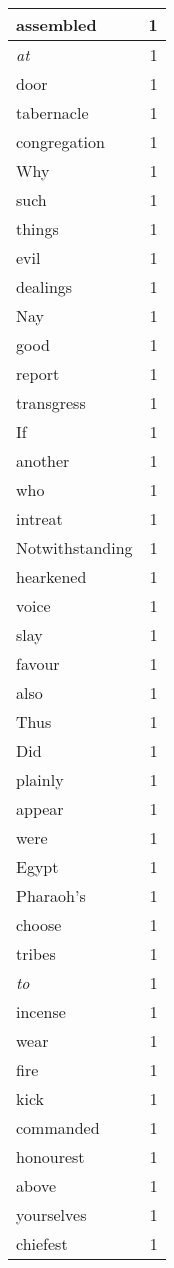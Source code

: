 \begin{center}
\begin{longtable}{l|r}
assembled & 1 \\ \hline
\emph{at} & 1 \\ \hline
door & 1 \\ \hline
tabernacle & 1 \\ \hline
congregation & 1 \\ \hline
Why & 1 \\ \hline
such & 1 \\ \hline
things & 1 \\ \hline
evil & 1 \\ \hline
dealings & 1 \\ \hline
Nay & 1 \\ \hline
good & 1 \\ \hline
report & 1 \\ \hline
transgress & 1 \\ \hline
If & 1 \\ \hline
another & 1 \\ \hline
who & 1 \\ \hline
intreat & 1 \\ \hline
Notwithstanding & 1 \\ \hline
hearkened & 1 \\ \hline
voice & 1 \\ \hline
slay & 1 \\ \hline
favour & 1 \\ \hline
also & 1 \\ \hline
Thus & 1 \\ \hline
Did & 1 \\ \hline
plainly & 1 \\ \hline
appear & 1 \\ \hline
were & 1 \\ \hline
Egypt & 1 \\ \hline
Pharaoh's & 1 \\ \hline
choose & 1 \\ \hline
tribes & 1 \\ \hline
\emph{to} & 1 \\ \hline
incense & 1 \\ \hline
wear & 1 \\ \hline
fire & 1 \\ \hline
kick & 1 \\ \hline
commanded & 1 \\ \hline
honourest & 1 \\ \hline
above & 1 \\ \hline
yourselves & 1 \\ \hline
chiefest & 1 \\ \hline

\end{longtable}
\end{center}
